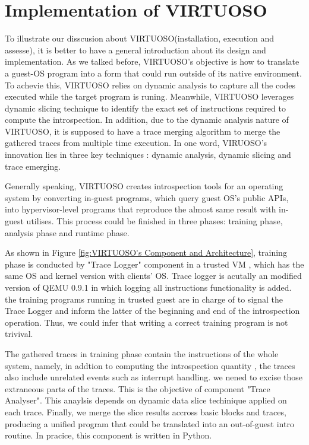 \section{Implementation of VIRTUOSO}
To illustrate our disscusion about VIRTUOSO(installation, execution and assesse), it is better to have a general introduction about
its design and implementation. As we talked before, VIRTUOSO's objective is how to translate a guest-OS program into a form that could run
outside of its native environment. To achevie this, VIRTUOSO relies on dynamic analysis to capture all the codes executed while the target
program is runing. Meanwhile, VIRTUOSO leverages dynamic slicing technique to identify the exact set of instructions required to compute the
introspection. In addition, due to the dynamic analysis nature of VIRTUOSO, it is supposed to have a trace merging algorithm to merge the
gathered traces from multiple time execution. In one word, VIRUOSO's innovation lies in three key techniques : dynamic analysis, dynamic 
slicing and trace emerging.

Generally speaking, VIRTUOSO creates introspection tools for an operating system by converting in-guest programs, which query guest OS's
public APIs, into hypervisor-level programs that reproduce the almost same result with in-guest utilises. This process could be finished
in three phases: training phase, analysis phase and runtime phase.

As shown in Figure \ref{fig:VIRTUOSO's Component and Architecture}, training phase is conducted by "Trace Logger" component in a trusted VM , 
which has the same OS and kernel version with clients' OS. Trace logger is acutally an modified version of QEMU 0.9.1 in which logging all instructions functionality
is added. the training programs running in trusted guest are in charge of to signal the Trace Logger and inform the latter of the beginning
and end of the introspection operation. Thus, we could infer that writing a correct training program is not trivival.

The gathered traces in training phase contain the instructions of the whole system, namely, in addtion to computing the introspection quantity
, the traces also include unrelated events such as interrupt handling. we nened to excise those extraneous parts of the traces. This is the
objective of component "Trace Analyser". This anaylsis depends on dynamic data slice techinique applied on each trace. Finally, we merge the slice
results accross basic blocks and traces, producing a unified program that could be translated into an out-of-guest intro routine. In pracice, this
component is written in Python. 

